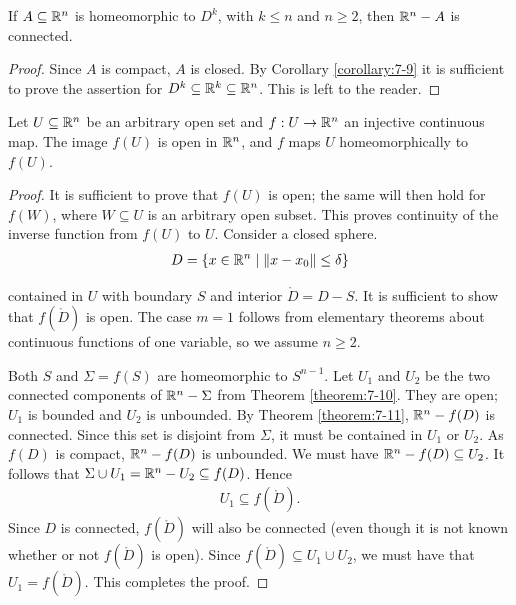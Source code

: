 \begin{theorem}\label{theorem:7-11}
  If $A\subseteq{\ensuremath{\mathbb{R}}}^n$ is homeomorphic to $D^k$, with $k\le n$ and $n\ge2$, then ${\mathbb{R}}^n-A$ is connected.
\end{theorem}

\begin{proof}
  Since $A$ is compact, $A$ is closed. By Corollary \ref{corollary:7-9} it is sufficient to prove
the assertion for $D^k\subseteq{\ensuremath{\mathbb{R}}}^k\subseteq{\ensuremath{\mathbb{R}}}^n$. This is left to the reader.
\end{proof}

\begin{theorem}[Brouwer]\label{theorem:7-12}
  Let $U\subseteq {\ensuremath{\mathbb{R}}}^n$ be an arbitrary open set and $f:U\to{\ensuremath{\mathbb{R}}}^n$
an injective continuous map. The image $f(U)$ is open in ${\mathbb{R}}^n$, and $f$ maps $U$
homeomorphically to $f(U)$.
\end{theorem}

\begin{proof}
  It is sufficient to prove that $f(U)$ is open; the same will then hold for
$f(W)$, where $W\subseteq U$ is an arbitrary open subset. This proves continuity of the
inverse function from $f(U)$ to $U$. Consider a closed sphere.
\begin{align*}
  D = \{x\in{\ensuremath{\mathbb{R}}}^n \mid \|x-x_0\|\le \delta\}
\end{align*}

contained in $U$ with boundary $S$ and interior $\mathring{D}= D - S$. It is sufficient to show
that $f(\mathring{D})$ is open. The case $m = 1$ follows from elementary theorems about
continuous functions of one variable, so we assume $n\ge 2$.

Both $S$ and $\Sigma = f(S)$ are homeomorphic to $S^{n-1}$. Let $U_1$ and $U_2$ be the two
connected components of ${\mathbb{R}}^n-\Sigma$ from Theorem \ref{theorem:7-10}. They are open; $U_1$ is
bounded and $U_2$ is unbounded. By Theorem \ref{theorem:7-11}, ${\mathbb{R}}^n - f(D)$ is connected.
Since this set is disjoint from $\Sigma$, it must be contained in $U_1$ or $U_2$. As $f(D)$ is
compact, ${\mathbb{R}}^n - f(D)$ is unbounded. We must have ${\mathbb{R}}^n - f(D)\subseteq U_2$. It follows
that $\Sigma\cup U_1 = {\mathbb{R}}^n-U_2 \subseteq f(D)$. Hence
\begin{align*}
  U_1 \subseteq f(\mathring{D}).
\end{align*}
Since $D$ is connected, $f(\mathring{D})$ will also be connected (even though it is not known
whether or not $f(\mathring{D})$ is open). Since $f(\mathring{D})\subseteq U_1\cup U_2$, we must 
have that $U_1 = f(\mathring{D})$. This completes the proof.
\end{proof}

